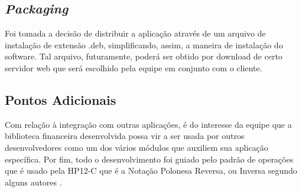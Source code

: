 \subsection{\textit{Packaging}}
Foi tomada a decisão de distribuir a aplicação através de um arquivo de instalação de extensão .deb, simplificando, assim, a maneira de instalação do software. Tal arquivo, futuramente, poderá ser obtido por download de certo servidor web que será escolhido pela equipe em conjunto com o cliente.

\subsection{Pontos Adicionais}
Com relação à integração com outras aplicações, é do interesse da equipe que a biblioteca financeira desenvolvida possa vir a ser usada por outros desenvolvedores como um dos vários módulos que auxiliem sua aplicação específica.
Por fim, todo o desenvolvimento foi guiado pelo padrão de operações que é usado pela HP12-C que é a Notação Polonesa Reversa, ou Inversa segundo alguns autores \cite{NPR}.